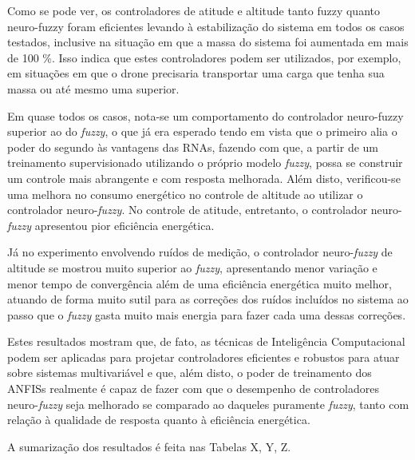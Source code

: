 Como se pode ver, os controladores de atitude e altitude tanto fuzzy quanto neuro-fuzzy foram eficientes levando à estabilização do sistema em todos os casos testados, inclusive na situação em que a massa do sistema foi aumentada em mais de 100 \%. Isso indica que estes controladores podem ser utilizados, por exemplo, em situações em que o drone precisaria transportar uma carga que tenha sua massa ou até mesmo uma superior.

Em quase todos os casos, nota-se um comportamento do controlador neuro-fuzzy superior ao do \textit{fuzzy}, o que já era esperado tendo em vista que o primeiro alia o poder do segundo às vantagens das RNAs, fazendo com que, a partir de um treinamento supervisionado utilizando o próprio modelo \textit{fuzzy}, possa se construir um controle mais abrangente e com resposta melhorada. Além disto, verificou-se uma melhora no consumo energético no controle de altitude ao utilizar o controlador neuro-\textit{fuzzy}. No controle de atitude, entretanto, o controlador neuro-\textit{fuzzy} apresentou pior eficiência energética.

Já no experimento envolvendo ruídos de medição, o controlador neuro-\textit{fuzzy} de altitude se mostrou muito superior ao \textit{fuzzy}, apresentando menor variação e menor tempo de convergência além de uma eficiência energética muito melhor, atuando de forma muito sutil para as correções dos ruídos incluídos no sistema ao passo que o \textit{fuzzy} gasta muito mais energia para fazer cada uma dessas correções.

Estes resultados mostram que, de fato, as técnicas de Inteligência Computacional podem ser aplicadas para projetar controladores eficientes e robustos para atuar sobre sistemas multivariável e que, além disto, o poder de treinamento dos ANFISs realmente é capaz de fazer com que o desempenho de controladores neuro-\textit{fuzzy} seja melhorado se comparado ao daqueles puramente \textit{fuzzy}, tanto com relação à qualidade de resposta quanto à eficiência energética.

A sumarização dos resultados é feita nas Tabelas X, Y, Z.


